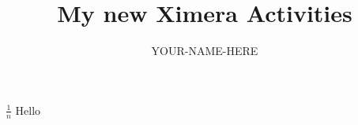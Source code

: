\documentclass{xourse}
\title{My new Ximera Activities}
\author{YOUR-NAME-HERE}
\begin{document}
\begin{abstract}
\end{abstract}
\maketitle

$\frac{1}{n}$
\vspace{3cm}
Hello
\end{document}

